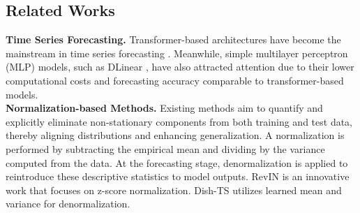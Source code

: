 \documentclass[sigconf,anonymous,review]{acmart}
\begin{document}
\subsection{Related Works}
\textbf{Time Series Forecasting.} 
Transformer-based architectures have become the mainstream in time series forecasting \citep{PatchTST, Crossformer, pdformer, liu2023itransformer}.
Meanwhile, simple multilayer perceptron (MLP) models, such as DLinear \citep{DLinear, chen2023tsmixer, zhou2022film}, have also attracted attention due to their lower computational costs and forecasting accuracy comparable to transformer-based models.\\
\textbf{Normalization-based Methods.}
Existing methods aim to quantify and explicitly eliminate non-stationary components from both training and test data, thereby aligning distributions and enhancing generalization.
A normalization is performed by subtracting the empirical mean and dividing by the variance computed from the data.
At the forecasting stage, denormalization is applied to reintroduce these descriptive statistics to model outputs.
RevIN \citep{kim2021RevIN} is an innovative work that focuses on z-score normalization.
Dish-TS \citep{fan2023dish} utilizes learned mean and variance for denormalization.
\end{document}
